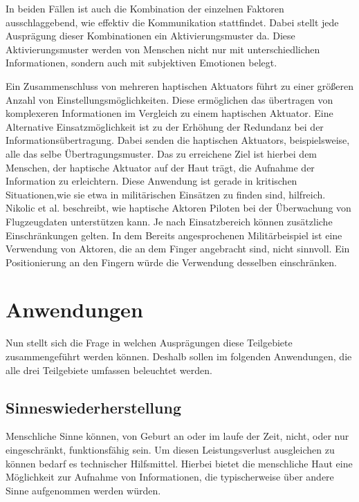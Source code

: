 \documentclass{llncs}					%
\begin{document}
In beiden Fällen ist auch die Kombination der einzelnen Faktoren ausschlaggebend, wie effektiv die Kommunikation stattfindet. Dabei stellt jede Ausprägung dieser Kombinationen ein Aktivierungsmuster da. Diese Aktivierungsmuster werden von Menschen nicht nur mit unterschiedlichen Informationen, sondern auch mit subjektiven Emotionen belegt\cite{5444662}.

Ein Zusammenschluss von mehreren haptischen \glspl{Aktuator} führt zu einer größeren Anzahl von Einstellungsmöglichkeiten. Diese ermöglichen das übertragen von komplexeren Informationen im Vergleich zu einem haptischen \gls{Aktuator}. Eine Alternative Einsatzmöglichkeit ist zu der Erhöhung der Redundanz bei der Informationsübertragung. Dabei senden die haptischen \glspl{Aktuator}, beispielsweise, alle das selbe Übertragungsmuster. Das zu erreichene Ziel ist hierbei dem Menschen, der haptische \gls{Aktuator} auf der Haut trägt, die Aufnahme der Information zu erleichtern. Diese Anwendung ist gerade in kritischen Situationen,wie sie etwa in militärischen Einsätzen zu finden sind, hilfreich\cite{nikolic1998multisensory}. Nikolic et al. \cite{nikolic1998multisensory} beschreibt, wie haptische Aktoren Piloten bei der Überwachung von Flugzeugdaten unterstützen kann.
Je nach Einsatzbereich können zusätzliche Einschränkungen gelten. In dem Bereits angesprochenen Militärbeispiel ist eine Verwendung von Aktoren, die an dem Finger angebracht sind, nicht sinnvoll. Ein Positionierung an den Fingern würde die Verwendung desselben einschränken.

\newpage
\section{Anwendungen}
Nun stellt sich die Frage in welchen Ausprägungen diese Teilgebiete zusammengeführt werden können. Deshalb sollen im folgenden Anwendungen, die alle drei Teilgebiete umfassen beleuchtet werden.

\subsection{Sinneswiederherstellung}
Menschliche Sinne können, von Geburt an oder im laufe der Zeit, nicht, oder nur eingeschränkt, funktionsfähig sein. Um diesen Leistungsverlust ausgleichen zu können bedarf es technischer Hilfsmittel. Hierbei bietet die menschliche Haut eine Möglichkeit zur Aufnahme von Informationen, die typischerweise über andere Sinne aufgenommen werden würden.
\end{document}
